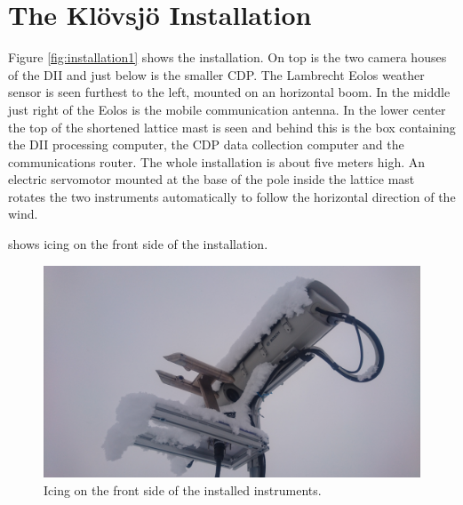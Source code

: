 \section{The Klövsjö Installation}
Figure \ref{fig:installation1} shows the installation. On top is the two camera houses of the DII and just below is the smaller CDP. The Lambrecht Eolos weather sensor is seen furthest to the left, mounted on an horizontal boom. In the middle just right of the Eolos is the mobile communication antenna. In the lower center the top of the shortened lattice mast is seen and behind this is the box containing the DII processing computer, the CDP data collection computer and the communications router. The whole installation is about five meters high. An electric servomotor mounted at the base of the pole inside the lattice mast rotates the two instruments automatically to follow the horizontal direction of the wind. 

 shows icing on the front side of the installation.

\begin{figure}[ht]
\centering\includegraphics[width=0.75\linewidth]{figures/installation3}
\caption{Icing on the front side of the installed instruments.}
\label{fig:installation3}
\end{figure}

